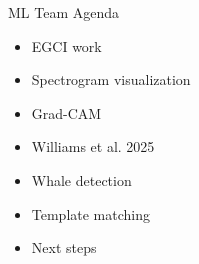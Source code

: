




\begin{frame}{ML Team Agenda}
    \begin{itemize}
        \item EGCI work
        \item Spectrogram visualization
        \item Grad-CAM
        \item Williams et al. 2025
        \item Whale detection
        \item Template matching
        \item Next steps
    \end{itemize}
\end{frame}

